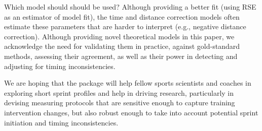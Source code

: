 \documentclass[
]{jss}
\begin{document}
Which model should should be used? Although providing a better fit (using RSE as an estimator of model fit), the time and distance correction models often estimate these parameters that are harder to interpret (e.g., negative distance correction). Although providing novel theoretical models in this paper, we acknowledge the need for validating them in practice, against gold-standard methods, assessing their agreement, as well as their power in detecting and adjusting for timing inconsistencies.

We are hoping that the  package will help fellow sports scientists and coaches in exploring short sprint profiles and help in driving research, particularly in devising measuring protocols that are sensitive enough to capture training intervention changes, but also robust enough to take into account potential sprint initiation and timing inconsistencies.

\renewcommand\refname{References}

\end{document}
